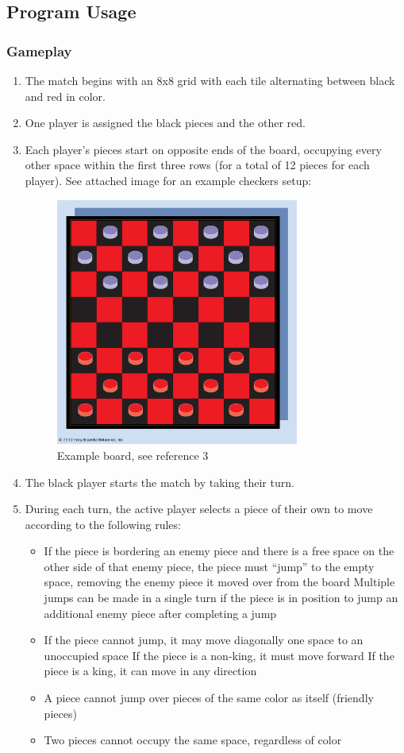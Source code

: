 \documentclass[10pt]{article}
\begin{document}
\subsection{Program Usage}
\subsubsection{Gameplay}
\begin{enumerate}[label*=G\arabic*.]
	\item The match begins with an 8x8 grid with each tile alternating between black and red in color.
	\item One player is assigned the black pieces and the other red.
	\item Each player’s pieces start on opposite ends of the board, occupying every other space within the first three rows (for a total of 12 pieces for each player).
	\subitem See attached image for an example checkers setup:
	\begin{figure}[h!]
        \centering
        \includegraphics[width=8cm]{board.png}
        \caption{Example board, see reference 3}
    \end{figure}
	\item The black player starts the match by taking their turn.
	\item During each turn, the active player selects a piece of their own to move according to the following rules:
\begin{itemize}
    \item If the piece is bordering an enemy piece and there is a free space on the other side of that enemy piece, the piece must “jump” to the empty space, removing the enemy piece it moved over from the board
        \subitem Multiple jumps can be made in a single turn if the piece is in position to jump an additional enemy piece after completing a jump
    \item If the piece cannot jump, it may move diagonally one space to an unoccupied space
        \subitem If the piece is a non-king, it must move forward
        \subitem If the piece is a king, it can move in any direction
    \item A piece cannot jump over pieces of the same color as itself (friendly pieces)
    \item Two pieces cannot occupy the same space, regardless of color
\end{itemize}


\end{enumerate}
\end{document}
